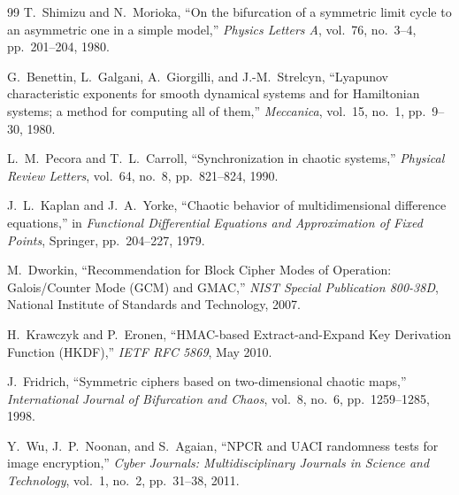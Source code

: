 \documentclass[12pt,a4paper,oneside]{report}
\begin{document}
\begin{thebibliography}{99}
T.~Shimizu and N.~Morioka, ``On the bifurcation of a symmetric limit cycle to an asymmetric one in a simple model,'' \emph{Physics Letters A}, vol.~76, no.~3--4, pp.~201--204, 1980.

G.~Benettin, L.~Galgani, A.~Giorgilli, and J.-M.~Strelcyn, ``Lyapunov characteristic exponents for smooth dynamical systems and for Hamiltonian systems; a method for computing all of them,'' \emph{Meccanica}, vol.~15, no.~1, pp.~9--30, 1980.

L.~M.~Pecora and T.~L.~Carroll, ``Synchronization in chaotic systems,'' \emph{Physical Review Letters}, vol.~64, no.~8, pp.~821--824, 1990.

J.~L.~Kaplan and J.~A.~Yorke, ``Chaotic behavior of multidimensional difference equations,'' in \emph{Functional Differential Equations and Approximation of Fixed Points}, Springer, pp.~204--227, 1979.

M.~Dworkin, ``Recommendation for Block Cipher Modes of Operation: Galois/Counter Mode (GCM) and GMAC,'' \emph{NIST Special Publication 800-38D}, National Institute of Standards and Technology, 2007.

H.~Krawczyk and P.~Eronen, ``HMAC-based Extract-and-Expand Key Derivation Function (HKDF),'' \emph{IETF RFC 5869}, May 2010.

J.~Fridrich, ``Symmetric ciphers based on two-dimensional chaotic maps,'' \emph{International Journal of Bifurcation and Chaos}, vol.~8, no.~6, pp.~1259--1285, 1998.

Y.~Wu, J.~P.~Noonan, and S.~Agaian, ``NPCR and UACI randomness tests for image encryption,'' \emph{Cyber Journals: Multidisciplinary Journals in Science and Technology}, vol.~1, no.~2, pp.~31--38, 2011.
\end{thebibliography}
\end{document}
